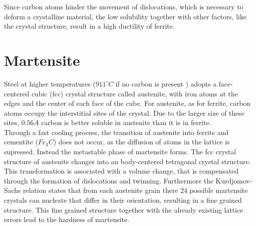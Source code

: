 Since carbon atoms hinder the movement of dislocations, which is necessary to deform a crystalline material, the low solubility together with other factors, like the crystal structure, result in a high ductility of ferrite. \\




\section{Martensite}

Steel at higher temperatures ($911^{\circ}C$ if no carbon is present \cite{Bleck2016}) adopts a face-centered cubic (fcc) crystal structure called austenite, with iron atoms at the edges and the center of each face of the cube. For austenite, as for ferrite, carbon atoms occupy the interstitial sites of the crystal. Due to the larger size of these sites, $0.56\mathring{A}$ \cite{Bleck2016} carbon is better soluble in austenite than it is in ferrite. \\

Through a fast cooling process, the transition of austenite into ferrite and cementite ($Fe_3C$) does not occur, as the diffusion of atoms in the lattice is supressed. Instead the metastable phase of martensite forms. The fcc crystal structure of austenite changes into an body-centered tetragonal crystal structure. This transformation is associated with a volume change, that is compensated through the formation of dislocations and twinning. Furthermore the Kurdjomov-Sachs relation states that from each austenite grain there $24$ possible martensite crystals can nucleate that differ in their orientation, resulting in a fine grained structure. This fine grained structure together with the already existing lattice errors lead to the hardness of martensite.

